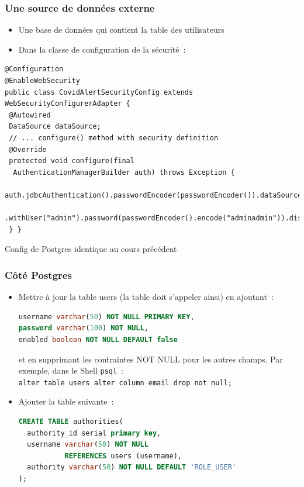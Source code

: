 \documentclass{beamer}
\begin{document}
\begin{frame}[fragile]
	\frametitle{Une source de données externe}
	\begin{itemize}
		\item Une base de données qui contient  la table des utilisateurs
		\item Dans la classe de configuration de la sécurité~:		
	\end{itemize}
\begin{lstlisting}
@Configuration
@EnableWebSecurity
public class CovidAlertSecurityConfig extends WebSecurityConfigurerAdapter {
 @Autowired
 DataSource dataSource;
 // ... configure() method with security definition
 @Override
 protected void configure(final 
  AuthenticationManagerBuilder auth) throws Exception {
  auth.jdbcAuthentication().passwordEncoder(passwordEncoder()).dataSource(dataSource)
  .withUser("admin").password(passwordEncoder().encode("adminadmin")).disabled(false).roles("USER","ADMIN");
 } }
\end{lstlisting}
Config de Postgres identique au cours précédent
	
\end{frame}

\begin{frame}[fragile]
	\frametitle{Côté Postgres}
	\begin{itemize}
		\item Mettre à jour la table users (la table doit s'appeler ainsi) en ajoutant~:
\begin{lstlisting}[language=Sql]
username varchar(50) NOT NULL PRIMARY KEY,
password varchar(100) NOT NULL,
enabled boolean NOT NULL DEFAULT false
\end{lstlisting}	
et en supprimant les contraintes NOT NULL pour les autres champs. Par exemple, dans le Shell \texttt{psql}~:\\
\footnotesize
\texttt{alter table users alter column email drop not null;}	
\normalsize
\item Ajouter la table suivante~:
\begin{lstlisting}[language=Sql]
CREATE TABLE authorities(
  authority_id serial primary key,
  username varchar(50) NOT NULL 
           REFERENCES users (username),
  authority varchar(50) NOT NULL DEFAULT 'ROLE_USER'
);
\end{lstlisting}		
	\end{itemize}
\end{frame}
\end{document}
